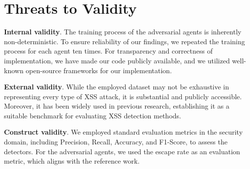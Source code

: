 \section{Threats to Validity}
\label{sec:threats}

\noindent \textbf{Internal validity}. 
The training process of the adversarial agents is inherently non-deterministic. To ensure reliability of our findings, we repeated the training process for each agent ten times. For transparency and correctness of implementation, we have made our code publicly available, and we utilized well-known open-source frameworks for our implementation.

\noindent \textbf{External validity}.
While the employed dataset may not be exhaustive in representing every type of XSS attack, it is substantial and publicly accessible. Moreover, it has been widely used in previous research, establishing it as a suitable benchmark for evaluating XSS detection methods.

\noindent \textbf{Construct validity}. We employed standard evaluation metrics in the security domain, including Precision, Recall, Accuracy, and F1-Score, to assess the detectors. For the adversarial agents, we used the escape rate as an evaluation metric, which aligns with the reference work.
